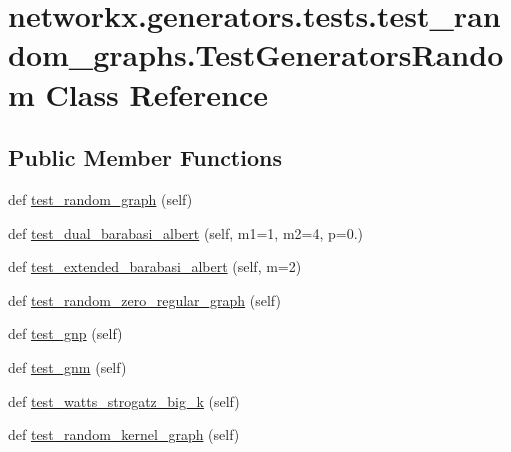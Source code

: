 \hypertarget{classnetworkx_1_1generators_1_1tests_1_1test__random__graphs_1_1TestGeneratorsRandom}{}\section{networkx.\+generators.\+tests.\+test\+\_\+random\+\_\+graphs.\+Test\+Generators\+Random Class Reference}
\label{classnetworkx_1_1generators_1_1tests_1_1test__random__graphs_1_1TestGeneratorsRandom}
\subsection*{Public Member Functions}
\begin{DoxyCompactItemize}
\item 
def \hyperlink{classnetworkx_1_1generators_1_1tests_1_1test__random__graphs_1_1TestGeneratorsRandom_aa091e348959acbb1690346ce5a6cdf65}{test\+\_\+random\+\_\+graph} (self)
\item 
def \hyperlink{classnetworkx_1_1generators_1_1tests_1_1test__random__graphs_1_1TestGeneratorsRandom_a508e06447cd74725ccca4d080123824f}{test\+\_\+dual\+\_\+barabasi\+\_\+albert} (self, m1=1, m2=4, p=0.)
\item 
def \hyperlink{classnetworkx_1_1generators_1_1tests_1_1test__random__graphs_1_1TestGeneratorsRandom_a9c2e4b38a4c1894b416dbee1c0295904}{test\+\_\+extended\+\_\+barabasi\+\_\+albert} (self, m=2)
\item 
def \hyperlink{classnetworkx_1_1generators_1_1tests_1_1test__random__graphs_1_1TestGeneratorsRandom_a109b05b04908da550e09bba3a72959d5}{test\+\_\+random\+\_\+zero\+\_\+regular\+\_\+graph} (self)
\item 
def \hyperlink{classnetworkx_1_1generators_1_1tests_1_1test__random__graphs_1_1TestGeneratorsRandom_a3a2c9adf76d9ace5df69d384762954d7}{test\+\_\+gnp} (self)
\item 
def \hyperlink{classnetworkx_1_1generators_1_1tests_1_1test__random__graphs_1_1TestGeneratorsRandom_aacbbb1e64d3720afa0151f8749c67b1b}{test\+\_\+gnm} (self)
\item 
def \hyperlink{classnetworkx_1_1generators_1_1tests_1_1test__random__graphs_1_1TestGeneratorsRandom_a06e6188a58f32c4c61882d77927116b0}{test\+\_\+watts\+\_\+strogatz\+\_\+big\+\_\+k} (self)
\item 
def \hyperlink{classnetworkx_1_1generators_1_1tests_1_1test__random__graphs_1_1TestGeneratorsRandom_ab05fae52cc0e77b735f3fae464174121}{test\+\_\+random\+\_\+kernel\+\_\+graph} (self)
\end{DoxyCompactItemize}


